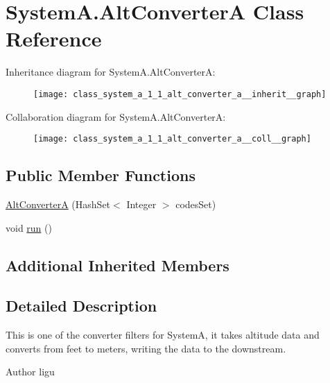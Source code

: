 \hypertarget{class_system_a_1_1_alt_converter_a}{}\section{System\+A.\+Alt\+Converter\+A Class Reference}
\label{class_system_a_1_1_alt_converter_a}


Inheritance diagram for System\+A.\+Alt\+Converter\+A\+:
\nopagebreak
\begin{figure}[H]
\begin{center}
\leavevmode
\texttt{[image: class\_system\_a\_1\_1\_alt\_converter\_a\_\_inherit\_\_graph]}
\end{center}
\end{figure}


Collaboration diagram for System\+A.\+Alt\+Converter\+A\+:
\nopagebreak
\begin{figure}[H]
\begin{center}
\leavevmode
\texttt{[image: class\_system\_a\_1\_1\_alt\_converter\_a\_\_coll\_\_graph]}
\end{center}
\end{figure}
\subsection*{Public Member Functions}
\begin{DoxyCompactItemize}
\item 
\hyperlink{class_system_a_1_1_alt_converter_a_ad794069151a7712741899c0739cf392a}{Alt\+Converter\+A} (Hash\+Set$<$ Integer $>$ codes\+Set)
\item 
void \hyperlink{class_system_a_1_1_alt_converter_a_a81ea7b005a50a268710ce0ccb89cc754}{run} ()
\end{DoxyCompactItemize}
\subsection*{Additional Inherited Members}


\subsection{Detailed Description}
This is one of the converter filters for System\+A, it takes altitude data and converts from feet to meters, writing the data to the downstream. \begin{DoxyAuthor}{Author}
ligu 
\end{DoxyAuthor}


